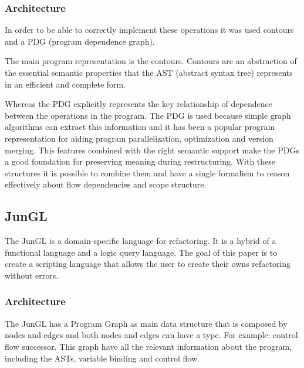 \subsubsection{Architecture}

In order to be able to correctly implement these operations it was used contours and a PDG (program dependence graph).

The main program representation is the contours. 
Contours are an abstraction of the essential semantic properties that the AST (abstract syntax tree) represents in an efficient and complete form.

Whereas the PDG explicitly represents the key relationship of dependence between the operations in the program. 
The PDG is used because simple graph algorithms can extract this information and it has been a popular program representation for aiding program parallelization, optimization and version merging.
This features combined with the right semantic support make the PDGs a good foundation for preserving meaning during restructuring.
With these structures it is possible to combine them and have a single formalism to reason effectively about flow dependencies and scope structure.




\subsection{JunGL} 


The JunGL \cite{verbaere2006jungl} is a domain-specific language for refactoring. 
It is a hybrid of a functional language and a logic query language. 
The goal of this paper is to create a scripting language that allows the user to create their owns refactoring without errors.

\subsubsection{Architecture}
The JunGL has a Program Graph as main data structure that is composed by nodes and edges and both nodes and edges can have a type. 
For example: control flow successor. 
This graph have all the relevant information about the program, including the ASTs, variable binding and control flow.

